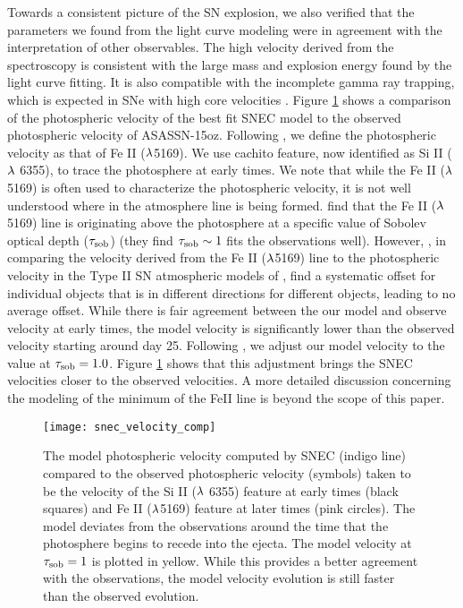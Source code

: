 \documentclass[a4paper,fleqn,usenatbib]{mnras}
\begin{document}
Towards a consistent picture of the SN explosion, we also verified that the parameters we found from the light curve modeling were in agreement with the interpretation of other observables.
The high velocity derived from the spectroscopy is consistent with the large mass and explosion energy found by the light curve fitting.
It is also compatible with the incomplete gamma ray trapping, which is expected in SNe with high core velocities \citep{2011jerkstrand}.
Figure \ref{fig:SNECVelocityCompare} shows a comparison of the photospheric velocity of the best fit SNEC model to the observed photospheric velocity of ASASSN-15oz.
Following \citet{2014faran}, we define the photospheric velocity as that of Fe II ($\rm{\lambda}$5169). 
We use cachito feature, now identified as Si II ($\rm{\lambda}$ 6355), to trace the photosphere at early times.
We note that while the Fe II ($\rm{\lambda}$5169) is often used to characterize the photospheric velocity, it is not well understood where in the atmosphere line is being formed. 
\citet{2018paxton} find that the Fe II ($\rm{\lambda}$5169) line is originating above the photosphere at a specific value of Sobolev optical depth ($\rm{\tau_{sob}}$) (they find $\rm{\tau_{sob} \sim1}$ fits the observations well).
However, \citet{2001hamuy}, in comparing the velocity derived from the Fe II ($\rm{\lambda}$5169) line to the photospheric velocity in the Type II SN atmospheric models of \citet{1996eastman}, find a systematic offset for individual objects that is in different directions for different objects, leading to no average offset. 
While there is fair agreement between the our model and observe velocity at early times, the model velocity is significantly lower than the observed velocity starting around day 25.
Following \citet{2018paxton}, we adjust our model velocity to the value at $\rm{\tau_{sob} = 1.0}$. 
Figure \ref{fig:SNECVelocityCompare} shows that this adjustment brings the SNEC velocities closer to the observed velocities.
A more detailed discussion concerning the modeling of the minimum of the FeII line is beyond the scope of this paper.
\begin{figure}
\begin{center}
\texttt{[image: snec\_velocity\_comp]} %
\caption{The model photospheric velocity computed by SNEC (indigo line) compared to the observed photospheric velocity (symbols) taken to be the velocity of the Si II ($\rm{\lambda}$ 6355) feature at early times (black squares) and Fe II ($\rm{\lambda}$5169) feature at later times (pink circles). 
The model deviates from the observations around the time that the photosphere begins to recede into the ejecta.
The model velocity at $\rm{\tau_{sob}=1}$ is plotted in yellow. 
While this provides a better agreement with the observations, the model velocity evolution is still faster than the observed evolution.
}
\label{fig:SNECVelocityCompare}
\end{center}
\end{figure}
\end{document}
